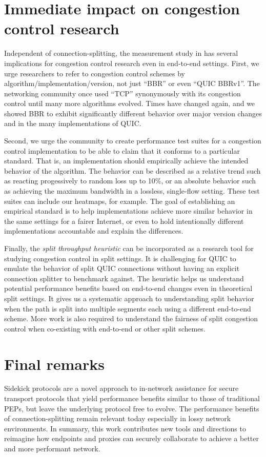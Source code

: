 \section{Immediate impact on congestion control research}
\label{sec:conclusion:congestion}

Independent of connection-splitting, the measurement study in
 has several implications for congestion control research
even in end-to-end settings. First, we urge researchers to refer
to congestion control schemes by algorithm/implementation/version, not just
``BBR'' or even ``QUIC BBRv1''. The networking community once used ``TCP''
synonymously with its congestion control until many more algorithms evolved.
Times have changed again, and we showed BBR to exhibit significantly different
behavior over major version changes and in the many implementations of QUIC.

Second, we urge the community to create performance test suites for a congestion
control implementation to be able to claim that it conforms to a particular
standard. That is, an implementation should empirically achieve the intended
behavior of the algorithm. The behavior can be described as a relative trend
such as reacting progessively to random loss up to 10\%, or an absolute
behavior such as achieving the maximum bandwidth in a lossless, single-flow
setting. These test suites can include our heatmaps, for example. The goal of
establishing an empirical standard is to help implementations achieve more
similar behavior in the same settings for a fairer Internet, or even to hold
intentionally different implementations accountable and explain the differences.

Finally, the \textit{split throughput heuristic} can be incorporated as a
research tool for studying congestion control in split settings. It is
challenging for QUIC to emulate the behavior of split QUIC connections without
having an explicit connection splitter to benchmark against. The heuristic
helps us understand potential performance benefits based on end-to-end changes
even in theoretical split settings. It gives us a systematic approach to
understanding split behavior when the path is split into multiple segments each
using a different end-to-end scheme. More work is also required to understand
the fairness of split congestion control when co-existing with end-to-end or
other split schemes.

\section{Final remarks}
\label{sec:conclusion:remarks}

Sidekick protocols are a novel approach to in-network assistance for secure
transport protocols that yield performance benefits similar to those of
traditional PEPs, but leave the underlying protocol free to evolve.
The performance benefits of connection-splitting remain relevant today
especially in lossy network environments. In summary, this work contributes
new tools and directions to reimagine how endpoints and proxies can securely
collaborate to achieve a better and more performant network.
